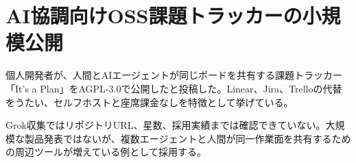 \section{AI協調向けOSS課題トラッカーの小規模公開}
個人開発者が、人間とAIエージェントが同じボードを共有する課題トラッカー「It's a Plan」をAGPL-3.0で公開したと投稿した。Linear、Jira、Trelloの代替をうたい、セルフホストと座席課金なしを特徴として挙げている。

Grok収集ではリポジトリURL、星数、採用実績までは確認できていない。大規模な製品発表ではないが、複数エージェントと人間が同一作業面を共有するための周辺ツールが増えている例として採用する。
